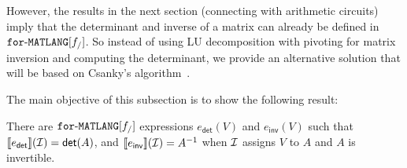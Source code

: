 However, the results
in the next section (connecting \langfor with arithmetic circuits) imply that the determinant
and inverse of a matrix can already be defined in $\texttt{for}\text{-}\texttt{MATLANG}[f_/]$. So instead of using LU decomposition with pivoting for matrix inversion and computing the determinant, we provide an alternative solution that will be based on Csanky's algorithm~\cite{Csanky76}.

The main objective of this subsection is to show the following result:

\begin{proposition}\label{prop:inverse}
    There are $\texttt{for}\text{-}\texttt{MATLANG}[f_/]$ expressions $e_{\mathsf{det}}(V)$ and $e_{\mathsf{inv}}(V)$ such that
    $\llbracket e_{\mathsf{det}} \rrbracket(\mathcal{I})=\mathsf{det}(A)$, and  
    $\llbracket e_{\mathsf{inv}} \rrbracket(\mathcal{I})=A^{-1}$ when $\mathcal{I}$ assigns $V$
    to $A$ and $A$ is invertible.
\end{proposition}



